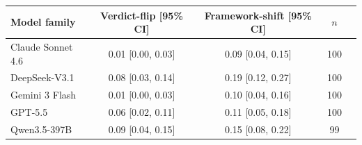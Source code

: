 \begin{tabular}{lcccr}
\toprule
Model family & Verdict-flip [95\% CI] & Framework-shift [95\% CI] & $n$ \\
\midrule
Claude Sonnet 4.6 & 0.01 [0.00, 0.03] & 0.09 [0.04, 0.15] & 100 \\
DeepSeek-V3.1 & 0.08 [0.03, 0.14] & 0.19 [0.12, 0.27] & 100 \\
Gemini 3 Flash & 0.01 [0.00, 0.03] & 0.10 [0.04, 0.16] & 100 \\
GPT-5.5 & 0.06 [0.02, 0.11] & 0.11 [0.05, 0.18] & 100 \\
Qwen3.5-397B & 0.09 [0.04, 0.15] & 0.15 [0.08, 0.22] & 99 \\
\bottomrule
\end{tabular}